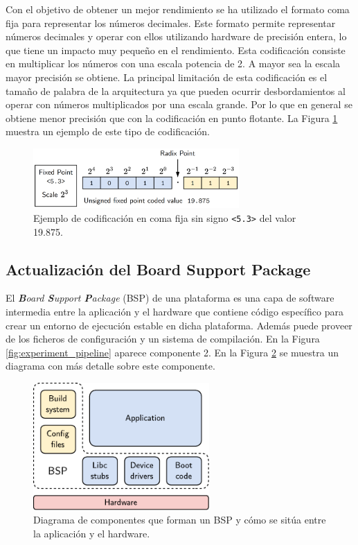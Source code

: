 Con el objetivo de obtener un mejor rendimiento se ha utilizado el formato coma fija para representar los números decimales. Este formato permite representar números decimales y operar con ellos utilizando hardware de precisión entera, lo que tiene un impacto muy pequeño en el rendimiento. Esta codificación consiste en multiplicar los números con una escala potencia de 2. A mayor sea la escala mayor precisión se obtiene. La principal limitación de esta codificación es el tamaño de palabra de la arquitectura ya que pueden ocurrir desbordamientos al operar con números multiplicados por una escala grande. Por lo que en general se obtiene menor precisión que con la codificación en punto flotante. La Figura \ref{fig:fixed_point} muestra un ejemplo de este tipo de codificación.

\begin{figure}[h]
	\centering
	\includegraphics[width=0.7\textwidth]{root/Imagenes/metodologia/fixed_point.png}
	\caption{Ejemplo de codificación en coma fija sin signo \texttt{<5.3>} del valor 19.875.}
	\label{fig:fixed_point}
\end{figure}

\subsection{Actualización del Board Support Package}

El \textit{\textbf{B}oard \textbf{S}upport \textbf{P}ackage} (BSP) de una plataforma es una capa de software intermedia entre la aplicación y el hardware que contiene código específico para crear un entorno de ejecución estable en dicha plataforma. Además puede proveer de los ficheros de configuración y un sistema de compilación. En la Figura \ref{fig:experiment_pipeline} aparece componente 2. En la Figura \ref{fig:bsp} se muestra un diagrama con más detalle sobre este componente.

\begin{figure}[h]
	\centering
	\includegraphics[width=0.6\textwidth]{root/Imagenes/metodologia/bsp.pdf}
	\caption{Diagrama de componentes que forman un BSP y cómo se sitúa entre la aplicación y el hardware.}
	\label{fig:bsp}
\end{figure}

